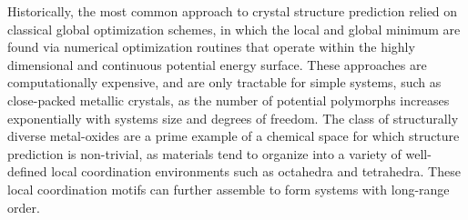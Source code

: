 %
%
Historically, the most common approach to crystal structure prediction relied on classical global optimization schemes,
in which the local and global minimum are found via numerical optimization routines that operate within the highly dimensional and continuous potential energy surface.
%
These approaches are computationally expensive, and are only tractable for simple systems, such as close-packed metallic crystals,
as the number of potential polymorphs increases exponentially with systems size and degrees of freedom.
\cite{Stillinger1999}
%
The class of structurally diverse metal-oxides are a prime example of a chemical space for which structure prediction is non-trivial, as materials tend to organize into a variety of well-defined local coordination environments such as octahedra and tetrahedra.
%
These local coordination motifs can further assemble to form systems with long-range order.


